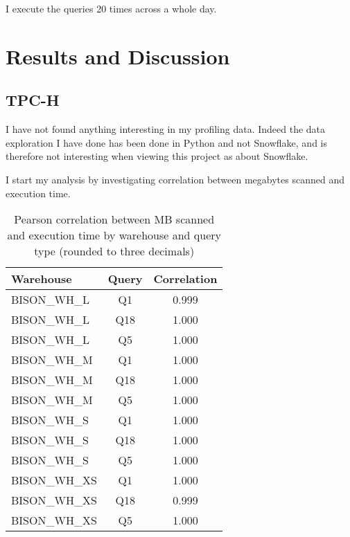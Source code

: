 \documentclass{article}
\begin{document}
\noindent I execute the queries 20 times across a whole day. 


\section{Results and Discussion}

\FloatBarrier

\subsection{TPC-H}

I have not found anything interesting in my profiling data. Indeed the data exploration I have done has been done in Python and not Snowflake, and is therefore not interesting when viewing this project as about Snowflake. 

\medskip \noindent I start my analysis by investigating correlation between megabytes scanned and execution time.

\begin{table}[htbp]
    \centering
    \begin{tabular}{lcc}
        \toprule
        \textbf{Warehouse} & \textbf{Query} & \textbf{Correlation} \\
        \midrule
        BISON\_WH\_L & Q1 & 0.999 \\
        BISON\_WH\_L & Q18 & 1.000 \\
        BISON\_WH\_L & Q5 & 1.000 \\
        \midrule
        BISON\_WH\_M & Q1 & 1.000 \\
        BISON\_WH\_M & Q18 & 1.000 \\
        BISON\_WH\_M & Q5 & 1.000 \\
        \midrule
        BISON\_WH\_S & Q1 & 1.000 \\
        BISON\_WH\_S & Q18 & 1.000 \\
        BISON\_WH\_S & Q5 & 1.000 \\
        \midrule
        BISON\_WH\_XS & Q1 & 1.000 \\
        BISON\_WH\_XS & Q18 & 0.999 \\
        BISON\_WH\_XS & Q5 & 1.000 \\
        \bottomrule
    \end{tabular}
    \caption{Pearson correlation between MB scanned and execution time by warehouse and query type (rounded to three decimals)}
    \label{tab:tpch_mbscanned_executiontime_correlations}
\end{table}
\end{document}
